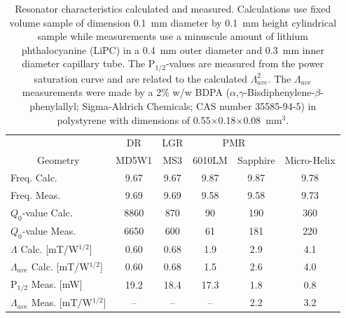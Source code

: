 \begin{table}[htbp]
\centering
\caption[Resonator characteristics calculated and measured.]{Resonator characteristics calculated and measured. Calculations use fixed volume sample of dimension  0.1~mm diameter by 0.1~mm height cylindrical sample while measurements use a minuscule amount of lithium phthalocyanine (LiPC) in a 0.4~mm outer diameter and 0.3~mm inner diameter capillary tube. The P$_{1/2}$-values are measured from the power saturation curve and are related to the calculated $\Lambda_{ave}^2$. The $\Lambda_{ave}$ measurements were made by a 2\% w/w BDPA ($\alpha$,$\gamma$-Bisdiphenylene-$\beta$-phenylallyl; Sigma-Aldrich Chemicals; CAS number 35585-94-5) in polystyrene with dimensions of 0.55$\times$0.18$\times$0.08~mm$^3$.}
\label{table:chars}
\begin{tabular}{l|c|c|c|c|c}
\multicolumn{1}{l}{} & DR & LGR & \multicolumn{2}{c|}{PMR} &  \\
\multicolumn{1}{c||}{Geometry} & MD5W1 & MS3 & 6010LM & Sapphire & Micro-Helix \\ \hline \hline
\multicolumn{1}{l||}{Freq. Calc.} & \multicolumn{1}{c|}{9.67} & \multicolumn{1}{c|}{9.67} & \multicolumn{1}{c|}{9.87} & \multicolumn{1}{c|}{9.87} & 9.78 \\ \hline 
\multicolumn{1}{l||}{Freq. Meas.} & \multicolumn{1}{c|}{9.69} & \multicolumn{1}{c|}{9.69} & \multicolumn{1}{c|}{9.58} & \multicolumn{1}{c|}{9.58} & 9.73 \\ \hline 
\multicolumn{1}{l||}{$Q_0$-value Calc.} & \multicolumn{1}{c|}{8860} & \multicolumn{1}{c|}{870} & \multicolumn{1}{c|}{90} & \multicolumn{1}{c|}{190} & 360 \\ \hline 
\multicolumn{1}{l||}{$Q_0$-value Meas.} & \multicolumn{1}{c|}{6650} & \multicolumn{1}{c|}{600} & \multicolumn{1}{c|}{61} & \multicolumn{1}{c|}{181} & 220 \\ \hline
\multicolumn{1}{l||}{$\Lambda$ Calc. {[}mT/W$^{1/2}${]}} & \multicolumn{1}{c|}{0.60} & \multicolumn{1}{c|}{0.68} & \multicolumn{1}{c|}{1.9} & \multicolumn{1}{c|}{2.9} & 4.1 \\ \hline 
\multicolumn{1}{l||}{$\Lambda_{ave}$ Calc. {[}mT/W$^{1/2}${]}} & \multicolumn{1}{c|}{0.60} & \multicolumn{1}{c|}{0.68} & \multicolumn{1}{c|}{1.5} & \multicolumn{1}{c|}{2.6} & 4.0 \\ \hline 
\multicolumn{1}{l||}{P$_{1/2}$ Meas. {[}mW{]}} & \multicolumn{1}{c|}{19.2} & \multicolumn{1}{c|}{18.4} & \multicolumn{1}{c|}{17.3} & \multicolumn{1}{c|}{1.8} & 0.8 \\ \hline 
\multicolumn{1}{l||}{$\Lambda_{ave}$ Meas. {[}mT/W$^{1/2}${]}} & \multicolumn{1}{c|}{–} & \multicolumn{1}{c|}{–} & \multicolumn{1}{c|}{–} & \multicolumn{1}{c|}{2.2} & 3.2
\end{tabular}
\end{table}

